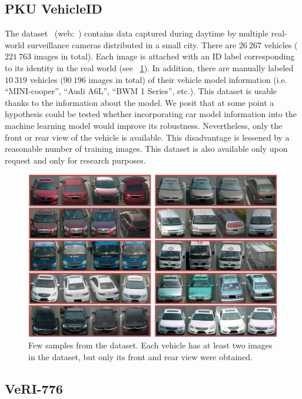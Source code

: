 \subsection{PKU VehicleID}
\label{ssec:DatasetPKUVehicleID}

The  dataset~\cite{liu2016deepreldist} (web:~\cite{webpkuvehicledataset}) contains data captured during daytime by multiple real-world surveillance cameras distributed in a small city. There are $26\ 267$ vehicles ($221\ 763$ images in total). Each image is attached with an ID label corresponding to its identity in the real world (see \figstr{}~\ref{fig:VehicleIDDataset}). In addition, there are manually labeled $10\ 319$ vehicles ($90\ 196$ images in total) of their vehicle model information (i.e. “MINI-cooper”, “Audi A6L”, “BWM 1 Series”, etc.). This dataset is usable thanks to the information about the model. We posit that at some point a hypothesis could be tested whether incorporating car model information into the machine learning model would improve its robustness. Nevertheless, only the front or rear view of the vehicle is available. This disadvantage is lessened by a reasonable number of training images. This dataset is also available only upon request and only for research purposes.

\begin{figure}[t]
    \centerline{\includegraphics[width=0.5\linewidth]{figures/datasets/vehicleid_overview.pdf}}
    \caption[ dataset]{Few samples from the  dataset. Each vehicle has at least two images in the dataset, but only its front and rear view were obtained. }
    \label{fig:VehicleIDDataset}
\end{figure}

\subsection{VeRI-776}
\label{ssec:DatasetVeRI776}

